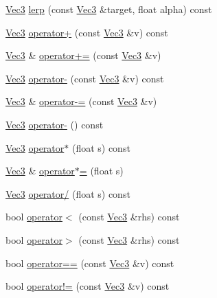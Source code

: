\begin{DoxyCompactItemize}
\item 
\hyperlink{classVec3}{Vec3} \hyperlink{classVec3_a1e1f3d58cfbb3083f263000500f76a57}{lerp} (const \hyperlink{classVec3}{Vec3} \&target, float alpha) const
\item 
\hyperlink{classVec3}{Vec3} \hyperlink{classVec3_afc46ae6022e89d29fe5456cab636d804}{operator+} (const \hyperlink{classVec3}{Vec3} \&v) const
\item 
\hyperlink{classVec3}{Vec3} \& \hyperlink{classVec3_a13b62337bd566c317958b92dc313c6c3}{operator+=} (const \hyperlink{classVec3}{Vec3} \&v)
\item 
\hyperlink{classVec3}{Vec3} \hyperlink{classVec3_ab16ba241e199e6604928cd5ae66e37d4}{operator-\/} (const \hyperlink{classVec3}{Vec3} \&v) const
\item 
\hyperlink{classVec3}{Vec3} \& \hyperlink{classVec3_a56e2011901279dc8a4da44218abde10a}{operator-\/=} (const \hyperlink{classVec3}{Vec3} \&v)
\item 
\hyperlink{classVec3}{Vec3} \hyperlink{classVec3_ab05753413af282b8cbd879c334c8e5aa}{operator-\/} () const
\item 
\hyperlink{classVec3}{Vec3} \hyperlink{classVec3_a81cf3600f990587096ec519b99f3b94d}{operator$\ast$} (float s) const
\item 
\hyperlink{classVec3}{Vec3} \& \hyperlink{classVec3_aa8e89c357d3f284ec2cfdc4e84cb674d}{operator$\ast$=} (float s)
\item 
\hyperlink{classVec3}{Vec3} \hyperlink{classVec3_a657e29e4b78eb5f4d1795305c26aa310}{operator/} (float s) const
\item 
bool \hyperlink{classVec3_a04aee1e04130243be776af6e44d6cb50}{operator$<$} (const \hyperlink{classVec3}{Vec3} \&rhs) const
\item 
bool \hyperlink{classVec3_a0dda78fca14e8888aa753ad5a5ae9980}{operator$>$} (const \hyperlink{classVec3}{Vec3} \&rhs) const
\item 
bool \hyperlink{classVec3_a9316a906e2b490aa9405bc17adc0078c}{operator==} (const \hyperlink{classVec3}{Vec3} \&v) const
\item 
bool \hyperlink{classVec3_a4e443bb623f755bdd56aed3b96459871}{operator!=} (const \hyperlink{classVec3}{Vec3} \&v) const
\end{DoxyCompactItemize}
